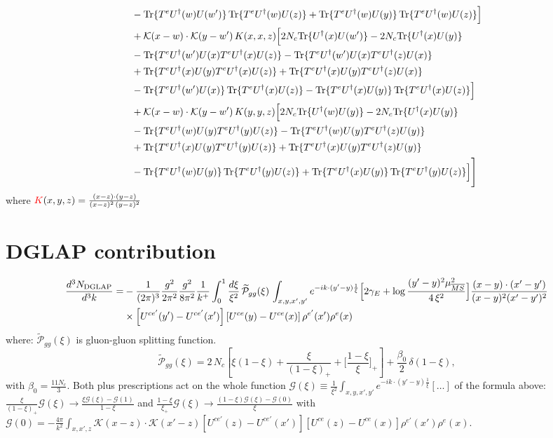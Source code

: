 \documentclass[9pt]{article}
\newcommand{\chg}[1]{{\color{red}#1}}
\numberwithin{equation}{section}
\begin{document}
\begin{align}
&-{\rm Tr}\{T^eU^\dagger(w)U(w')\}\,{\rm Tr}\{T^eU^\dagger(w)U(z)\}+{\rm Tr}\{T^eU^\dagger(w)U(y)\}\,{\rm Tr}\{T^eU^\dagger(w)U(z)\}\Big]\notag\\
&+\mathcal K(x-w)\cdot\mathcal K(y-w')\,K(x,x,z)\Big[2 N_{c}{\rm Tr}\{U^\dagger(x)U(w')\}-2 N_{c}{\rm Tr}\{U^\dagger(x)U(y)\}\notag\\
&-{\rm Tr}\{T^eU^\dagger(w')U(x)T^eU^\dagger(x)U(z)\}-{\rm Tr}\{T^eU^\dagger(w')U(x)T^eU^\dagger(z)U(x)\}\notag\\
&+{\rm Tr}\{T^eU^\dagger(x)U(y)T^eU^\dagger(x)U(z)\}+{\rm Tr}\{T^eU^\dagger(x)U(y)T^eU^\dagger(z)U(x)\}\notag\\
&-{\rm Tr}\{T^eU^\dagger(w')U(x)\}\,{\rm Tr}\{T^eU^\dagger(x)U(z)\}-{\rm Tr}\{T^eU^\dagger(x)U(y)\}\,{\rm Tr}\{T^eU^\dagger(x)U(z)\}\Big]\notag\\
&+\mathcal K(x-w)\cdot\mathcal K(y-w')\,K(y,y,z)\Big[2 N_{c}{\rm Tr}\{U^\dagger(w)U(y)\}-2 N_{c}{\rm Tr}\{U^\dagger(x)U(y)\}\notag\\
&-{\rm Tr}\{T^eU^\dagger(w)U(y)T^eU^\dagger(y)U(z)\}-{\rm Tr}\{T^eU^\dagger(w)U(y)T^eU^\dagger(z)U(y)\}\notag\\
&+{\rm Tr}\{T^eU^\dagger(x)U(y)T^eU^\dagger(y)U(z)\}+{\rm Tr}\{T^eU^\dagger(x)U(y)T^eU^\dagger(z)U(y)\}\notag\\
&-{\rm Tr}\{T^eU^\dagger(w)U(y)\}\,{\rm Tr}\{T^eU^\dagger(y)U(z)\}+{\rm Tr}\{T^eU^\dagger(x)U(y)\}\,{\rm Tr}\{T^eU^\dagger(y)U(z)\}\Big]\Bigg]
\end{align}
where $\chg{K}(x,y,z) = \frac{(x-z)\cdot (y-z)}{(x-z)^{2}\,(y-z)^{2}}$
\section{DGLAP contribution}
\begin{align}
\frac{d^{3}N_{\rm DGLAP}}{d^{3}k}= &-\frac{1}{(2\pi)^{3}}\frac{g^{2}}{2\pi^{2}}\frac{g^{2}}{8\pi^{2}}\frac{1}{k^{+}}\int_{0}^{1}\frac{d\xi}{\xi^{2}}\,\widetilde{\mathcal P}_{gg}(\xi)\,\int_{x,y,x',y'}e^{-ik\cdot(y'-y)\frac{1}{\xi}}\Big[2\gamma_{E}+\log\frac{(y'-y)^{2}\mu^{2}_{\overline{MS}}}{4\,\xi^{2}}\Big]\frac{(x-y)\cdot(x'-y')}{(x-y)^{2}(x'-y')^{2}}\notag\\
&\times\left[U^{ce'}(y') - U^{ce'}(x')\right]\left[U^{ce}(y) - U^{ce}(x)\right]\rho^{e'}(x')\rho^{e}(x)
\end{align}
where:
$\widetilde{\mathcal{P}}_{gg}(\xi)$ is gluon-gluon splitting function.
$$\widetilde{\mathcal{P}}_{gg}(\xi) = 2\,N_{c}\left[\xi(1-\xi) + \frac{\xi}{(1-\xi)_{+}} + \Big[\frac{1-\xi}{\xi}\Big]_{+}\right]+\frac{\beta_{0}}{2}\,\delta(1-\xi),$$
\chg{with $\beta_{0}=\frac{11N_{c}}{3}$. Both plus prescriptions act on the whole function $\mathcal{G}(\xi)\equiv\frac{1}{\xi^{2}}\int_{x,y,x',y'}e^{-ik\cdot(y'-y)\frac{1}{\xi}}[\ldots]$ of the formula above: $\frac{\xi}{(1-\xi)_{+}}\mathcal{G}(\xi)\to\frac{\xi\mathcal{G}(\xi)-\mathcal{G}(1)}{1-\xi}$ and $\frac{1-\xi}{\xi_{+}}\mathcal{G}(\xi)\to\frac{(1-\xi)\mathcal{G}(\xi)-\mathcal{G}(0)}{\xi}$ with
$\mathcal{G}(0)=-\frac{4\pi}{k^{2}}\int_{x,x',z}\mathcal{K}(x-z)\cdot\mathcal{K}(x'-z)\left[U^{ce'}(z) - U^{ce'}(x')\right]\left[U^{ce}(z) - U^{ce}(x)\right]\rho^{e'}(x')\rho^{e}(x)$.}
\end{document}

